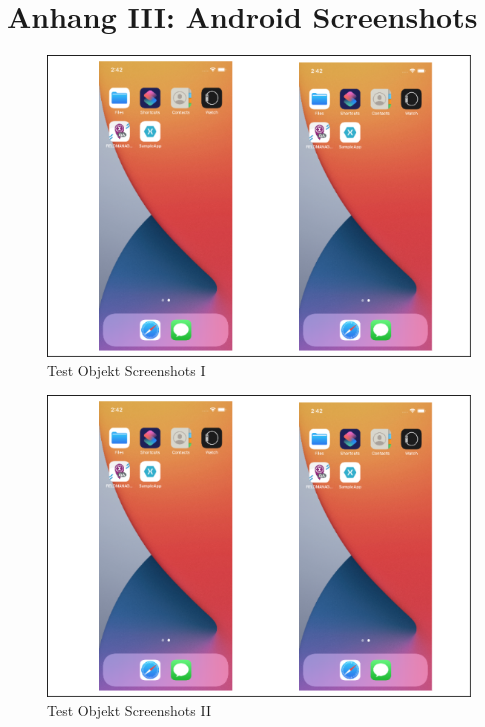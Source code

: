 \chapter{Anhang III: Android Screenshots}
\label{chap:AnhangAndroidScreenshots}


\begin{figure}[!ht]
 \includegraphics[width=\textwidth,keepaspectratio]{Images/Screenshot/AppIconAndMenu.png}
 \caption[]{Test Objekt Screenshots I}
\end{figure}

\begin{figure}[!ht]
 \includegraphics[width=\textwidth,keepaspectratio]{Images/Screenshot/AppIconAndMenu.png}
 \caption[]{Test Objekt Screenshots II}
\end{figure}

